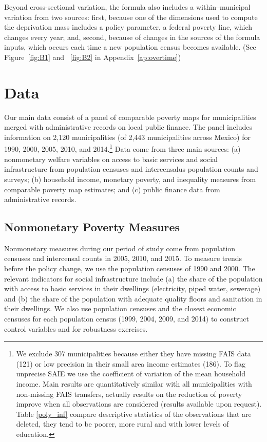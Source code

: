 \documentclass[dv_diss_main.tex]{subfiles}
\begin{document}
Beyond cross-sectional variation, the formula also includes a within–municipal variation from two sources: first, because one of the dimensions used to compute the deprivation mass includes a policy parameter, a federal poverty line, which changes every year; and, second, because of changes in the sources of the formula inputs, which occurs each time a new population census becomes available. (See Figure~\ref{fig:B1} and ~\ref{fig:B2} in Appendix~\ref{ap:overtime})

\section{Data} \label{sec:data}

Our main data consist of a panel of comparable poverty maps for municipalities merged with administrative records on local public finance. The panel includes information on 2,120 municipalities (of 2,443 municipalities across Mexico) for 1990, 2000, 2005, 2010, and 2014.\footnote{ We exclude 307 municipalities because either they have missing FAIS data (121) or low precision in their small area income estimates (186). To flag unprecise SAIE we use the coefficient of variation of the mean household income. Main results are quantitatively similar with all municipalities with non-missing FAIS transfers, actually results on the reduction of poverty improve when all observations are considered (results available upon request). Table \ref{poly_inf} compare descriptive statistics of the observations that are deleted, they tend to be poorer, more rural and with lower levels of education.} Data come from three main sources: (a) nonmonetary welfare variables on access to basic services and social infrastructure from population censuses and intercensalus population counts and surveys; (b) household income, monetary poverty, and inequality measures from comparable poverty map estimates; and (c) public finance data from administrative records.

\subsection {Nonmonetary Poverty Measures} \label{subsec:non}

Nonmonetary measures during our period of study come from population censuses and intercensal counts in 2005, 2010, and 2015. To measure trends before the policy change, we use the population censuses of 1990 and 2000. The relevant indicators for social infrastructure include (a) the share of the population with access to basic services in their dwellings (electricity, piped water, sewerage) and (b) the share of the population with adequate quality floors and sanitation in their dwellings. We also use population censuses and the closest economic censuses for each population census (1999, 2004, 2009, and 2014) to construct control variables and for robustness exercises.
\end{document}
